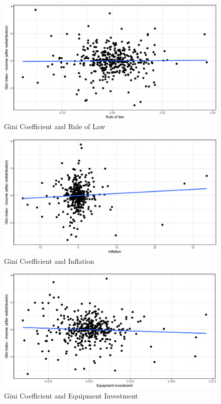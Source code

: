 \documentclass[a4paper,11pt]{article}
\begin{document}
\begin{figure}
    \caption{Gini Coefficient and Rule of Law}
\includegraphics[width=\textwidth, keepaspectratio]{figures/RuleLawGiniNet_dm}
\end{figure}

\begin{figure}
    \caption{Gini Coefficient and Inflation}
\includegraphics[width=\textwidth, keepaspectratio]{figures/InflGiniNet_dm}
\end{figure}

\begin{figure}
    \caption{Gini Coefficient and Equipment Investment}
\includegraphics[width=\textwidth, keepaspectratio]{figures/EquipIGiniNet_dm}
\end{figure}
\end{document}
